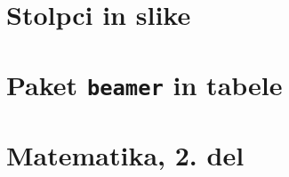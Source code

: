 \documentclass{beamer}
\begin{document}



\section{Stolpci in slike}




\section{Paket \texttt{beamer} in tabele}




\section[Matematika, 2. del\\\large{Zaporedja, algebra, grupe}]{Matematika, 2. del}


\end{document}

